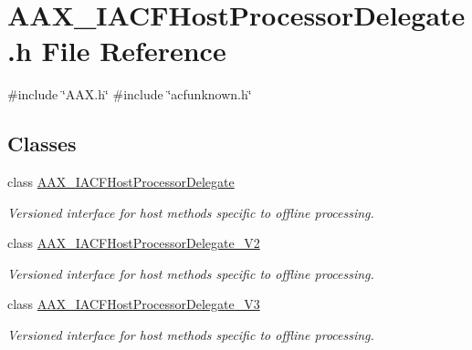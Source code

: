 \hypertarget{a00539}{}\section{A\+A\+X\+\_\+\+I\+A\+C\+F\+Host\+Processor\+Delegate.\+h File Reference}
\label{a00539}
{\ttfamily \#include \char`\"{}A\+A\+X.\+h\char`\"{}}\newline
{\ttfamily \#include \char`\"{}acfunknown.\+h\char`\"{}}\newline
\subsection*{Classes}
\begin{DoxyCompactItemize}
\item 
class \mbox{\hyperlink{a01701}{A\+A\+X\+\_\+\+I\+A\+C\+F\+Host\+Processor\+Delegate}}
\begin{DoxyCompactList}\small\item\em Versioned interface for host methods specific to offline processing. \end{DoxyCompactList}\item 
class \mbox{\hyperlink{a01705}{A\+A\+X\+\_\+\+I\+A\+C\+F\+Host\+Processor\+Delegate\+\_\+\+V2}}
\begin{DoxyCompactList}\small\item\em Versioned interface for host methods specific to offline processing. \end{DoxyCompactList}\item 
class \mbox{\hyperlink{a01709}{A\+A\+X\+\_\+\+I\+A\+C\+F\+Host\+Processor\+Delegate\+\_\+\+V3}}
\begin{DoxyCompactList}\small\item\em Versioned interface for host methods specific to offline processing. \end{DoxyCompactList}\end{DoxyCompactItemize}
